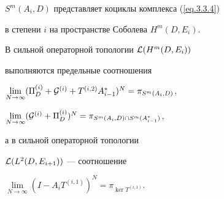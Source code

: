 $S^m (A_i, D)$ представляет коциклы комплекса (\ref{eq.3.3.4})


в степени $i$ на пространстве Соболева $H^m (D,E_i)$.








\begin{cor}


\label{c.6.2i}


В сильной операторной топологии ${\cal L} (H^{m} (D, E_i))$


выполняются предельные соотношения


$\lim\limits_{N \to \infty}


(\Pi ^{(i)}_{D}+{\cal G}^{(i)}+T^{(i,2)} A^*_{i-1})^{N}


=\pi_{S ^m(A_{i}, D)}$,


$\lim\limits_{N \to \infty}


({\cal G}^{(i)}+\Pi^{(i)}_D)^{N}


=\pi_{S ^m(A_{i}, D)\cap S^m (A^*_{i-1})}$,


а в сильной операторной топологии


${\cal L} (L^{2} (D, E_{i+1}))$ --- соотношение


$\lim\limits_{N \to \infty}


(I - A_i T^{(i,1)})^{N}=\pi_{\ker T^{(i,1)} }$.


\end{cor}








